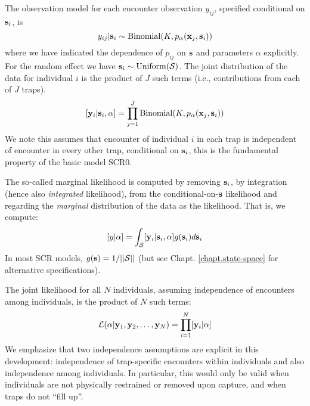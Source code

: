 The observation model for each encounter observation $y_{ij}$,
specified conditional on ${\bf s}_{i}$, is 
\begin{equation}
y_{ij}| {\bf s}_{i} \sim \mbox{Binomial}(K, p_{\alpha}({\bf x}_{j},{\bf s}_{i}))
\label{mle.eq.cond-on-s}
\end{equation}
where we have indicated the dependence of $p_{ij}$ on ${\bf s}$ and
parameters $\alpha$
explicitly.
For the random effect we have ${\bf s}_{i} \sim  \mbox{Uniform}({\cal
  S})$.
The joint distribution of the data for individual $i$ is the product
of $J$ such terms (i.e., contributions from each of $J$ traps).
\[
  [{\bf y}_{i} | {\bf s}_{i} , \alpha] = 
  \prod_{j=1}^{J} \mbox{Binomial}(K, p_{\alpha}({\bf x}_{j},{\bf s}_{i}) )
\]
We note this assumes that encounter of individual $i$ in each
trap is independent of encounter in every other trap, conditional on
${\bf s}_{i}$, this is the fundamental property of the basic model SCR0.


 The so-called marginal likelihood is computed by removing
${\bf s}_{i}$, by integration (hence also {\it integrated} likelihood), from the conditional-on-${\bf s}$
likelihood and regarding the {\it marginal} distribution of the data
as 
the likelihood. That
is, we compute:
\[
  [y|\alpha] = 
\int_{{\cal S}}  [ {\bf y}_{i} |{\bf s}_{i}, \alpha] g({\bf s}_{i}) d{\bf s}_{i}
\]
In most SCR models, $g({\bf s}) = 1/||{\cal S}||$ (but see Chapt. \ref{chapt.state-space} for
alternative specifications).

The joint likelihood for all $N$ individuals, assuming independence of
encounters among individuals, is the product of $N$ such terms:
\[
{\cal L}(\alpha | {\bf y}_{1},{\bf y}_{2},\ldots, {\bf y}_{N}) =     \prod_{i=1}^{N}
[{\bf y}_{i}|\alpha]
\]
We emphasize that two independence assumptions are explicit in this
development: independence of trap-specific encounters within
individuals and also independence among individuals. In particular,
this would only be valid when individuals are not physically
restrained or removed upon capture, and when traps do not ``fill up''.

